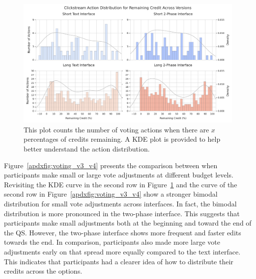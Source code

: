 \begin{figure}[ht]
    \centering
    \includegraphics[width=\textwidth]{content/image/results/clickstream_action_distribution.pdf}
    \caption{This plot counts the number of voting actions when there are $x$ percentages of credits remaining. A KDE plot is provided to help better understand the action distribution.}
    \label{apdxfig:voting_all}
\end{figure}

Figure~\ref{apdxfig:voting_v3_v4} presents the comparison between when participants make small or large vote adjustments at different budget levels. Revisiting the KDE curve in the second row in Figure~\ref{apdxfig:voting_all} and the curve of the second row in Figure~\ref{apdxfig:voting_v3_v4} show a stronger bimodal distribution for small vote adjustments across interfaces. In fact, the bimodal distribution is more pronounced in the two-phase interface. This suggests that participants make small adjustments both at the beginning and toward the end of the QS. However, the two-phase interface shows more frequent and faster edits towards the end. In comparison, participants also made more large vote adjustments early on that spread more equally compared to the text interface. This indicates that participants had a clearer idea of how to distribute their credits across the options.

